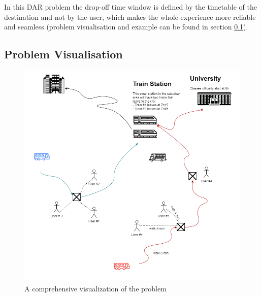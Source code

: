 \documentclass{article}
\begin{document}
In this DAR problem the drop-off time window is defined by the timetable of the destination and not by the user, which makes the whole experience more reliable and seamless (problem visualisation and example can be found in section \ref{subsec:problem_vis}). 


\subsection{Problem Visualisation}
\label{subsec:problem_vis}

\begin{figure}[H]
\centering
\includegraphics[scale=0.4]{pictures/Display_problem}
\caption{A comprehensive visualization of the problem}
\label{fig:Diagram}
\end{figure}
\end{document}
